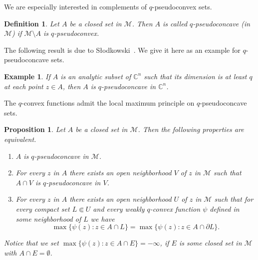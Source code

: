 \documentclass[11pt,a4paper]{article}
\newtheorem{prop}[lem]{Proposition}
\newtheorem{ex}[lem]{Example}
\newtheorem{defn}[lem]{Definition}
\newcommand{\CC}{\mathbb{C}}
\newcommand{\Mcal}{\mathcal{M}}
\begin{document}
We are especially interested in complements of $q$-pseudoconvex sets.

\begin{defn} Let $A$ be a closed set in $\Mcal$. Then $A$ is called \emph{$q$-pseudoconcave (in $\Mcal$)} if $\Mcal\setminus A$ is $q$-pseudoconvex.
\end{defn}

The following result is due to S{\l}odkowski~\cite[Proposition~5.2]{Sl}. We give it here as an example for $q$-pseudoconcave sets.

\begin{ex}\label{ex-q-pscve-analytic} If $A$ is an analytic subset of $\CC^n$ such that its dimension is at least $q$ at each point $z \in A$, then $A$ is $q$-pseudoconcave in $\CC^n$. 
\end{ex}


The $q$-convex functions admit the local maximum principle on $q$-pseudoconcave sets.


\begin{prop}\label{prop-qcvx-loc-max} Let $A$ be a closed set in $\Mcal$. Then the following properties are equivalent.

\begin{enumerate}

\item $A$ is $q$-pseudoconcave in $\Mcal$.

\item For every $z$ in $A$ there exists an open neighborhood $V$ of $z$ in $\Mcal$ such that $A \cap V$ is  $q$-pseudoconcave in $V$.

\item For every $z$ in $A$ there exists an open neighborhood $U$ of $z$ in $\Mcal$ such that for every  compact set $L \Subset U$ and every weakly $q$-convex function $\psi$ defined in some neighborhood of $L$ we have 
\[
\max\{\psi(z): z \in A \cap L\} = \max\{\psi(z): z \in A \cap \partial L\}.
\]

\end{enumerate}


Notice that we set $\max\{\psi(z): z \in A \cap E\}=-\infty$, if $E$ is some closed set in $\Mcal$ with $A \cap E=\emptyset$.

\end{prop}
\end{document}
